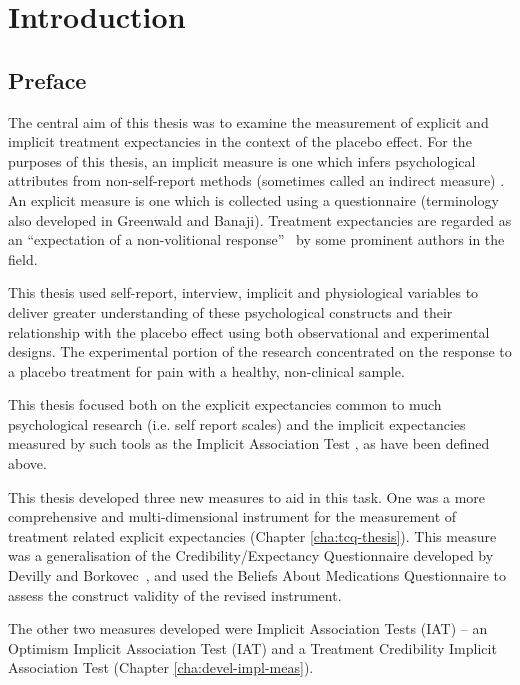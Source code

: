 
\chapter{Introduction}

\section{Preface}
\label{sec:preface}



The central aim of this thesis was to examine the measurement of explicit and implicit treatment expectancies in the context of the placebo effect. 
For the purposes of this thesis, an implicit measure is one which infers psychological attributes from non-self-report methods (sometimes called an indirect measure) \cite{Greenwald1995a}. An explicit measure is one which is collected using a questionnaire (terminology also developed in Greenwald and Banaji). Treatment expectancies are regarded as an ``expectation of a non-volitional response''~\cite{Kirsch1985} by some prominent authors in the field. 

 
This thesis used self-report, interview, implicit and physiological variables to deliver greater understanding of these psychological constructs and their relationship with the placebo effect using both observational and experimental designs.  The experimental portion of the research concentrated on the response to a placebo treatment for pain with a healthy, non-clinical sample. 

This thesis focused both on the explicit expectancies common to much psychological research (i.e. self report scales) and the implicit expectancies measured by such tools as the Implicit Association Test \cite{Greenwald1998}, as have been defined above. 

This thesis developed three new measures to aid in this task. One was a more comprehensive and multi-dimensional instrument for the measurement of treatment related explicit expectancies (Chapter \ref{cha:tcq-thesis}). This measure was a generalisation of the Credibility/Expectancy Questionnaire developed by Devilly and Borkovec~\cite{Devilly2000}, and used the Beliefs About Medications Questionnaire \cite{Horne1999} to assess the construct validity of the revised instrument. 

The other two measures developed were Implicit Association Tests (IAT) -- an Optimism Implicit Association Test (IAT) and a Treatment Credibility Implicit Association Test (Chapter \ref{cha:devel-impl-meas}). 

